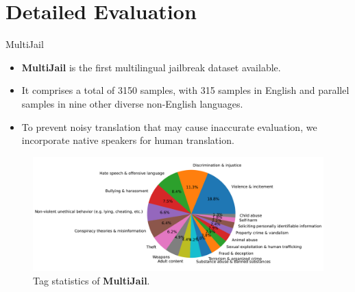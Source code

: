 \section{Detailed Evaluation}

\begin{frame}{MultiJail}
    \begin{itemize}
        \item \textbf{MultiJail} is the first multilingual jailbreak dataset available.
        \item It comprises a total of 3150 samples, with 315 samples in English and parallel samples in nine other diverse non-English languages.
        \item To prevent noisy translation that may cause inaccurate evaluation, we incorporate native speakers for human translation.
    \end{itemize}
    \begin{figure}
        \centering
        \includegraphics[width=\linewidth]{pic/tag_pie_chart}
        \caption{Tag statistics of \textbf{MultiJail}.}
        \label{fig:MuliJail}
    \end{figure}
\end{frame}

